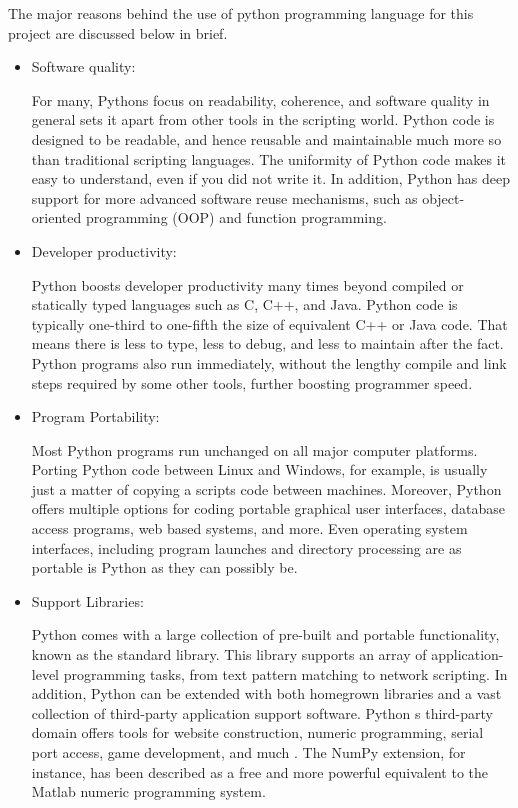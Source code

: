 The major reasons behind the use of python programming language for this project are discussed below in brief.
\begin{itemize}
	\item Software quality:
	
	For many, Python\textquotesingle s focus on readability, coherence, and software quality in general
	sets it apart from other tools in the scripting world. Python code is designed to be
	readable, and hence reusable and maintainable much more so than traditional
	scripting languages. The uniformity of Python code makes it easy to understand,
	even if you did not write it. In addition, Python has deep support for more advanced
	software reuse mechanisms, such as object-oriented programming (OOP) and function programming.
	
	\item Developer productivity:
	
	Python boosts developer productivity many times beyond compiled or statically
	typed languages such as C, C++, and Java. Python code is typically one-third to
	one-fifth the size of equivalent C++ or Java code. That means there is less to type, 
	less to debug, and less to maintain after the fact. Python programs also run immediately, without the lengthy compile and link steps required by some other tools, 
	further boosting programmer speed.
	
	\item Program Portability:
	
	Most Python programs run unchanged on all major computer platforms. Porting
	Python code between Linux and Windows, for example, is usually just a matter of
	copying a script\textquotesingle s code between machines. Moreover, Python offers multiple options for coding portable graphical user interfaces, database access programs, web based systems, and more. Even operating system interfaces, including program launches and directory processing are as portable is Python as they can possibly be.
	
	\item Support Libraries:
	
	Python comes with a large collection of pre-built and portable functionality, known
	as the standard library. This library supports an array of application-level programming tasks, from text pattern matching to network scripting. In addition,
	Python can be extended with both homegrown libraries and a vast collection of
	third-party application support software. Python \textquotesingle s third-party domain offers tools
	for website construction, numeric programming, serial port access, game development, and much . The NumPy extension, for instance, has been described as a free and more powerful equivalent to the Matlab numeric programming system.
	

\end{itemize}
